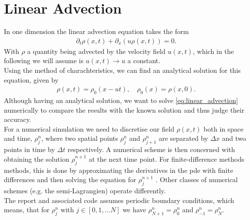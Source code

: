 \section{Linear Advection}\label{ch:linear_advection}
In one dimension the linear advection equation takes the form 
\begin{align}
\partial_t\rho(x,t) + \partial_x(u \rho(x,t)) = 0.\label{eq:linear_advection}
\end{align}
With $\rho$ a quantity being advected by the velocity field $u(x,t)$, which in the following we will assume is $u(x,t)\rightarrow u$ a constant.\\
Using the method of charachteristics, we can find an analytical solution for this equation, given by
\begin{align}
\rho(x,t) = \rho_0(x-ut),\quad \rho_0(x) = \rho(x,0).
\end{align}
Although having an analytical solution, we want to solve \cref{eq:linear_advection} numerically to compare the results with the known solution and thus judge their accuracy. \\
For a numerical simulation we need to discretise our field $\rho(x,t)$ both in space and time, $\rho_j^n$, where two spatial points $\rho_j^n$ and $\rho_{j+1}^n$ are separated by $\Delta x$ and two points in time by $\Delta t$ respectively. A numerical scheme is then concerned with obtaining the solution $\rho_j^{n+1}$ at the next time point. For finite-difference methods  methods, this is done by approximating the derivatives in the pde with finite differences and then solving the equation for $\rho_j^{n+1}$ . Other classes of numerical schemes (e.g. the semi-Lagrangien) operate differently.\\
The report and associated code assumes periodic boundary conditions, which means, that for $\rho_j^{n}$ with $j \in [0,1,... N] $ we have $\rho_{N+1}^n=\rho_0^n$ and $\rho_{-1}^n=\rho_N^n$.